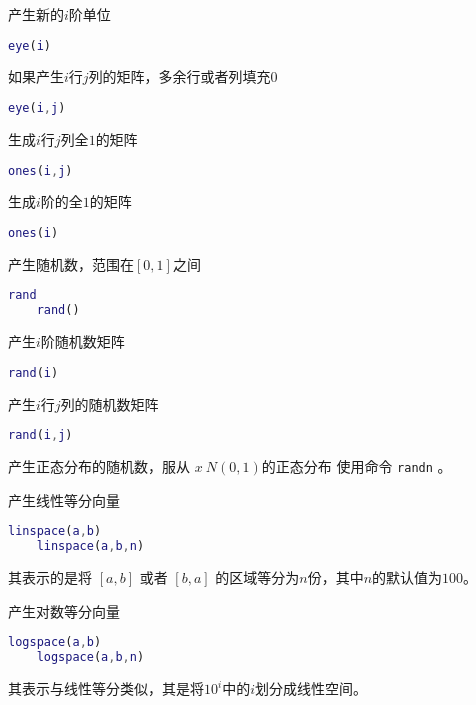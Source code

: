 \documentclass{ctexart}
\begin{document}
  产生新的$i$阶单位
  \begin{lstlisting}[language=matlab]
    eye(i)
  \end{lstlisting}
  如果产生$i$行$j$列的矩阵，多余行或者列填充0
  \begin{lstlisting}[language=matlab]
    eye(i,j)
  \end{lstlisting}

  生成$i$行$j$列全$1$的矩阵
  \begin{lstlisting}[language=matlab]
    ones(i,j)
  \end{lstlisting}
  生成$i$阶的全$1$的矩阵
  \begin{lstlisting}[language=matlab]
    ones(i)
  \end{lstlisting}

  产生随机数，范围在$[0,1]$之间
  \begin{lstlisting}[language=matlab]
    rand
    rand()
  \end{lstlisting}
  产生$i$阶随机数矩阵
  \begin{lstlisting}[language=matlab]
    rand(i)
  \end{lstlisting}
  产生$i$行$j$列的随机数矩阵
  \begin{lstlisting}[language=matlab]
    rand(i,j)
  \end{lstlisting}

  产生正态分布的随机数，服从 $x~N(0,1)$的正态分布
  使用命令 \lstinline|randn| 。

  产生线性等分向量
  \begin{lstlisting}[language=matlab]
    linspace(a,b)
    linspace(a,b,n)
  \end{lstlisting}
  其表示的是将 $[a,b]$ 或者 $[b,a]$ 的区域等分为$n$份，其中$n$的默认值为$100$。

  产生对数等分向量
  \begin{lstlisting}[language=matlab]
    logspace(a,b)
    logspace(a,b,n)
  \end{lstlisting}
  其表示与线性等分类似，其是将$10^i$中的$i$划分成线性空间。
\end{document}

